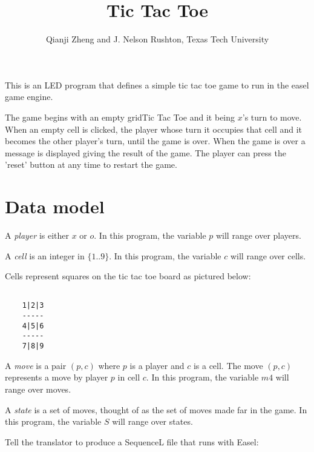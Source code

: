 \documentclass{led_doc}
\begin{document}
\begin{ledCmnt}
\title{Tic Tac Toe}
\date{}
\author{Qianji Zheng and J. Nelson Rushton, Texas Tech University}
\maketitle

This is an LED program that defines a simple tic tac toe game to run in the easel game engine.

The game begins with an empty gridTic Tac Toe
 and it being $x$'s turn to move. When an empty cell is clicked,
the player whose turn it occupies that cell and it becomes the other player's turn, until the
game is over. When the game is over a message is displayed giving the result of the  game.
The player can press the 'reset' button at any time to restart the game.

\section{Data model}


A {\em player} is either $x$ or $o$. In this program, the variable $p$ will range over players.

A {\em cell} is an integer in $\{1..9\}$. In this program, the variable $c$ will range over cells.

Cells represent squares on the tic tac toe board as pictured below:

\begin{verbatim}

    1|2|3
    -----
    4|5|6
    -----
    7|8|9

\end{verbatim}

A {\em move} is a pair $(p,c)$ where $p$ is a player and $c$ is a cell.
The move $(p,c)$ represents a move by player $p$ in cell $c$. In this program,
the variable $m4$ will range over moves.

A {\em state} is a set of moves, thought of as the set of moves made far in the
game. In this program, the variable $S$ will range over states.

Tell the translator to produce a SequenceL file that runs with Easel:
\end{ledCmnt}
\end{document}
